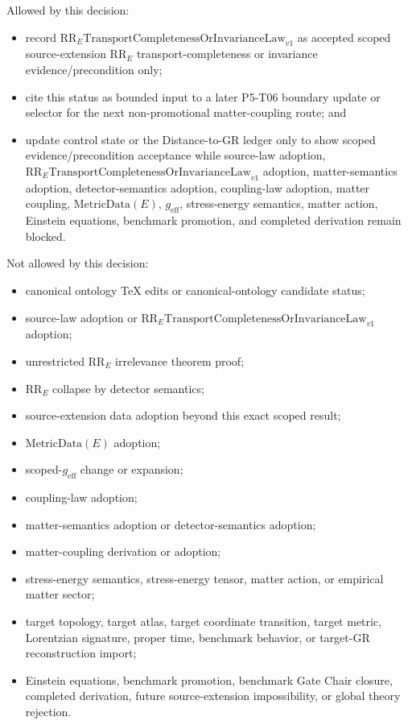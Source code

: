 \documentclass[11pt]{article}
\newcommand{\RRE}{\mathrm{RR}_{E}}
\newcommand{\LawRR}{\mathrm{RR}_{E}\mathrm{TransportCompletenessOrInvarianceLaw}_{v1}}
\newcommand{\MetricData}{\mathrm{MetricData}}
\newcommand{\geff}{g_{\mathrm{eff}}}
\begin{document}
Allowed by this decision:
\begin{itemize}[leftmargin=*]
  \item record \(\LawRR\) as accepted scoped source-extension \(\RRE\)
  transport-completeness or invariance evidence/precondition only;
  \item cite this status as bounded input to a later P5-T06 boundary update or
  selector for the next non-promotional matter-coupling route; and
  \item update control state or the Distance-to-GR ledger only to show scoped
  evidence/precondition acceptance while source-law adoption, \(\LawRR\)
  adoption, matter-semantics adoption, detector-semantics adoption,
  coupling-law adoption, matter coupling, \(\MetricData(E)\), \(\geff\),
  stress-energy semantics, matter action, Einstein equations, benchmark
  promotion, and completed derivation remain blocked.
\end{itemize}

Not allowed by this decision:
\begin{itemize}[leftmargin=*]
  \item canonical ontology TeX edits or canonical-ontology candidate status;
  \item source-law adoption or \(\LawRR\) adoption;
  \item unrestricted \(\RRE\) irrelevance theorem proof;
  \item \(\RRE\) collapse by detector semantics;
  \item source-extension data adoption beyond this exact scoped result;
  \item \(\MetricData(E)\) adoption;
  \item scoped-\(\geff\) change or expansion;
  \item coupling-law adoption;
  \item matter-semantics adoption or detector-semantics adoption;
  \item matter-coupling derivation or adoption;
  \item stress-energy semantics, stress-energy tensor, matter action, or
  empirical matter sector;
  \item target topology, target atlas, target coordinate transition, target
  metric, Lorentzian signature, proper time, benchmark behavior, or target-GR
  reconstruction import;
  \item Einstein equations, benchmark promotion, benchmark Gate Chair closure,
  completed derivation, future source-extension impossibility, or global
  theory rejection.
\end{itemize}
\end{document}
